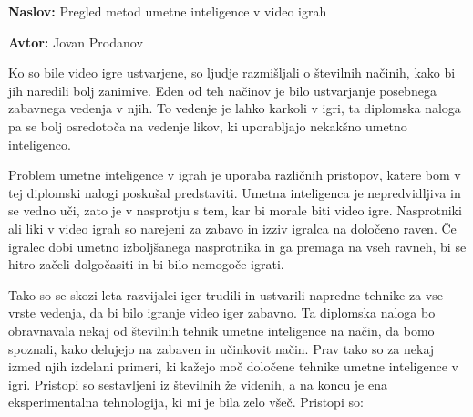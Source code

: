 \documentclass[a4paper, 12pt]{book}
\newcommand{\ttitle}{Pregled metod umetne inteligence v video igrah}
\newcommand{\tauthor}{Jovan Prodanov}
\begin{document}
\noindent\textbf{Naslov:} \ttitle
\bigskip

\noindent\textbf{Avtor:} \tauthor
\bigskip

Ko so bile video igre ustvarjene, so ljudje razmišljali o številnih načinih, kako bi jih naredili bolj zanimive. Eden od teh načinov je bilo ustvarjanje posebnega zabavnega vedenja v njih. To vedenje je lahko karkoli v igri, ta diplomska naloga pa se bolj osredotoča na vedenje likov, ki uporabljajo nekakšno umetno inteligenco.

Problem umetne inteligence v igrah je uporaba različnih pristopov, katere bom v tej diplomski nalogi poskušal predstaviti. Umetna inteligenca je nepredvidljiva in se vedno uči, zato je v nasprotju s tem, kar bi morale biti video igre. Nasprotniki ali liki v video igrah so narejeni za zabavo in izziv igralca na določeno raven. Če igralec dobi umetno izboljšanega nasprotnika in ga premaga na vseh ravneh, bi se hitro začeli dolgočasiti in bi bilo nemogoče igrati.

Tako so se skozi leta razvijalci iger trudili in ustvarili napredne tehnike za vse vrste vedenja, da bi bilo igranje video iger zabavno. Ta diplomska naloga bo obravnavala nekaj od številnih tehnik umetne inteligence na način, da bomo spoznali, kako delujejo na zabaven in učinkovit način. Prav tako so za nekaj izmed njih izdelani primeri, ki kažejo moč določene tehnike umetne inteligence v igri. Pristopi so sestavljeni iz številnih že videnih, a na koncu je ena eksperimentalna tehnologija, ki mi je bila zelo všeč. Pristopi so:

\clearpage
\end{document}
